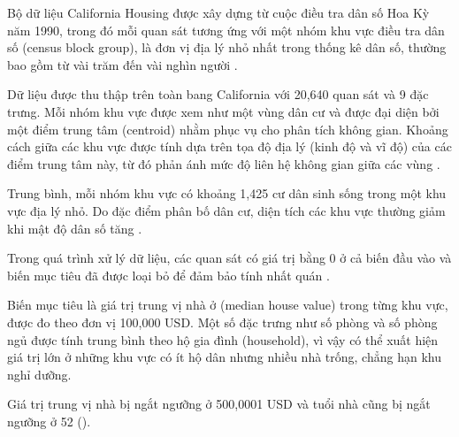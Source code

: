 Bộ dữ liệu California Housing được xây dựng từ cuộc điều tra dân số Hoa Kỳ năm
1990, trong đó mỗi quan sát tương ứng với một nhóm khu vực điều tra dân số
(census block group), là đơn vị địa lý nhỏ nhất trong thống kê dân số, thường
bao gồm từ vài trăm đến vài nghìn người \cite{pace1997sparse}.

Dữ liệu được thu thập trên toàn bang California với 20,640 quan sát và 9 đặc
trưng. Mỗi nhóm khu vực được xem như một vùng dân cư và được đại diện bởi một
điểm trung tâm (centroid) nhằm phục vụ cho phân tích không gian. Khoảng cách
giữa các khu vực được tính dựa trên tọa độ địa lý (kinh độ và vĩ độ) của các
điểm trung tâm này, từ đó phản ánh mức độ liên hệ không gian giữa các vùng
\cite{pace1997sparse}.

Trung bình, mỗi nhóm khu vực có khoảng 1,425 cư dân sinh sống trong một khu vực
địa lý nhỏ. Do đặc điểm phân bố dân cư, diện tích các khu vực thường giảm khi
mật độ dân số tăng \cite{pace1997sparse}.

Trong quá trình xử lý dữ liệu, các quan sát có giá trị bằng 0 ở cả biến đầu vào
và biến mục tiêu đã được loại bỏ để đảm bảo tính nhất quán
\cite{pace1997sparse}.

Biến mục tiêu là giá trị trung vị nhà ở (median house value) trong từng khu
vực, được đo theo đơn vị 100,000 USD. Một số đặc trưng như số phòng và số phòng
ngủ được tính trung bình theo hộ gia đình (household), vì vậy có thể xuất hiện
giá trị lớn ở những khu vực có ít hộ dân nhưng nhiều nhà trống, chẳng hạn khu
nghỉ dưỡng.

Giá trị trung vị nhà bị ngắt ngưỡng ở 500,0001 USD và tuổi nhà cũng bị ngắt
ngưỡng ở 52 (\cite[p.~51]{geron2019hands}).
